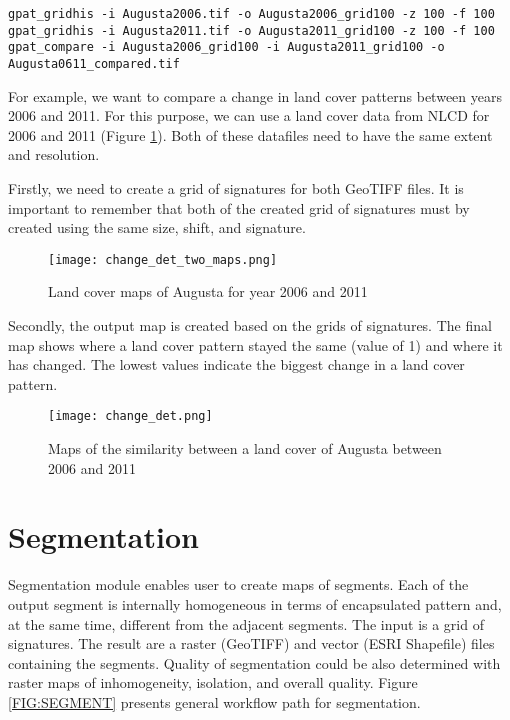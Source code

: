 \begin{minipage}{\linewidth}
\begin{lstlisting}
gpat_gridhis -i Augusta2006.tif -o Augusta2006_grid100 -z 100 -f 100
gpat_gridhis -i Augusta2011.tif -o Augusta2011_grid100 -z 100 -f 100
gpat_compare -i Augusta2006_grid100 -i Augusta2011_grid100 -o Augusta0611_compared.tif
\end{lstlisting}
\end{minipage}

For example, we want to compare a change in land cover patterns between years 2006 and 2011. 
For this purpose, we can use a land cover data from NLCD for 2006 and 2011 (Figure \ref{FIG:CHANGEDET1}).
Both of these datafiles need to have the same extent and resolution.

Firstly, we need to create a grid of signatures for both GeoTIFF files.
It is important to remember that both of the created grid of signatures must by created using the same size, shift, and signature.

\begin{figure}[H]
	\centering
	\texttt{[image: change\_det\_two\_maps.png]}
	\caption{Land cover maps of Augusta for year 2006 and 2011}
	\label{FIG:CHANGEDET1}
\end{figure}

Secondly, the output map is created based on the grids of signatures.
The final map shows where a land cover pattern stayed the same (value of 1) and where it has changed. 
The lowest values indicate the biggest change in a land cover pattern.

\begin{figure}[H]
	\centering
	\texttt{[image: change\_det.png]}
	\caption{Maps of the similarity between a land cover of Augusta between 2006 and 2011}
	\label{FIG:CHANGEDET2}
\end{figure}

\FloatBarrier

\section{Segmentation \label{segmentation}}

Segmentation module enables user to create maps of segments.
Each of the output segment is internally homogeneous in terms of encapsulated pattern and, at the same time, different from the adjacent segments.
The input is a grid of signatures.
The result are a raster (GeoTIFF) and vector (ESRI Shapefile) files containing the segments.
Quality of segmentation could be also determined with raster maps of inhomogeneity, isolation, and overall quality.
Figure \ref{FIG:SEGMENT} presents general workflow path for segmentation. 

